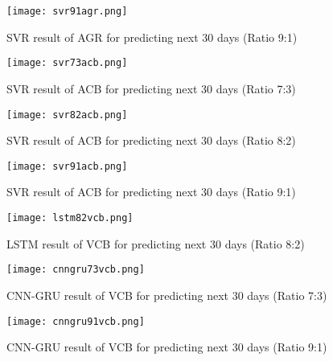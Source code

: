 \documentclass{ieeeojies}
\begin{document}
{\begin{figure}[H]
    \centering
    \texttt{[image: svr91agr.png]}
    \caption{\centering SVR result of AGR for predicting next 30 days (Ratio 9:1)}
    \label{fig:enter-label}
\end{figure}

\begin{figure}[H]
    \centering
    \texttt{[image: svr73acb.png]}
    \caption{\centering SVR result of ACB for predicting next 30 days (Ratio 7:3)}
    \label{fig:enter-label}
\end{figure}

\begin{figure}[H]
    \centering
    \texttt{[image: svr82acb.png]}
    \caption{\centering SVR result of ACB for predicting next 30 days (Ratio 8:2)}
    \label{fig:enter-label}
\end{figure}

\begin{figure}[H]
    \centering
    \texttt{[image: svr91acb.png]}
    \caption{\centering SVR result of ACB for predicting next 30 days (Ratio 9:1)}
    \label{fig:enter-label}
\end{figure}

\begin{figure}[H]
    \centering
    \texttt{[image: lstm82vcb.png]}
    \caption{\centering LSTM result of VCB for predicting next 30 days (Ratio 8:2)}
    \label{fig:enter-label}
\end{figure}

\begin{figure}[H]
    \centering
    \texttt{[image: cnngru73vcb.png]}
    \caption{\centering CNN-GRU result of VCB for predicting next 30 days (Ratio 7:3)}
    \label{fig:enter-label}
\end{figure}

\begin{figure}[H]
    \centering
    \texttt{[image: cnngru91vcb.png]}
    \caption{\centering CNN-GRU result of VCB for predicting next 30 days (Ratio 9:1)}
    \label{fig:enter-label}
\end{figure}
}
\end{document}
